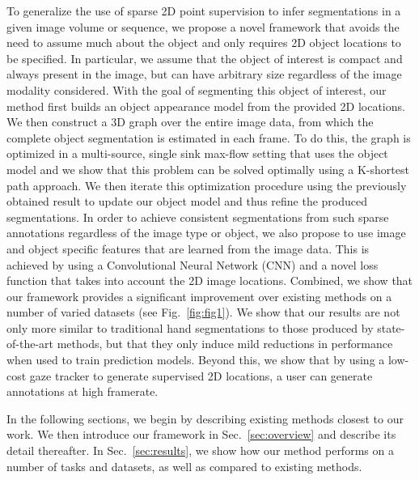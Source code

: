 To generalize the use of sparse 2D point supervision to infer segmentations in a given image volume or sequence, we propose a novel framework that avoids the need to assume much about the object and only requires 2D object locations to be specified. In particular, we assume that the object of interest is compact and always present in the image, but can have arbitrary size regardless of the image modality considered. With the goal of segmenting this object of interest, our method first builds an object appearance model from the provided 2D locations. We then construct a 3D graph over the entire image data, from which the complete object segmentation is estimated in each frame. To do this, the graph is optimized in a multi-source, single sink max-flow setting that uses the object model and we show that this problem can be solved optimally using a K-shortest path approach. We then iterate this optimization procedure using the previously obtained result to update our object model and thus refine the produced segmentations. In order to achieve consistent segmentations from such sparse annotations regardless of the image type or object, we also propose to use image and object specific features that are learned from the image data. This is achieved by using a Convolutional Neural Network (CNN) and a novel loss function that takes into account the 2D image locations. Combined, we show that our framework provides a significant improvement over existing methods on a number of varied datasets (see Fig.~\ref{fig:fig1}). We show that our results are not only more similar to traditional hand segmentations to those produced by state-of-the-art methods, but that they only induce mild reductions in performance when used to train prediction models. Beyond this, we show that by using a low-cost gaze tracker to generate supervised 2D locations, a user can generate annotations at high framerate.


In the following sections, we begin by describing existing methods closest to our work. We then introduce our framework in Sec.~\ref{sec:overview} and describe its detail thereafter. In Sec.~\ref{sec:results}, we show how our method performs on a number of tasks and datasets, as well as compared to existing methods.

